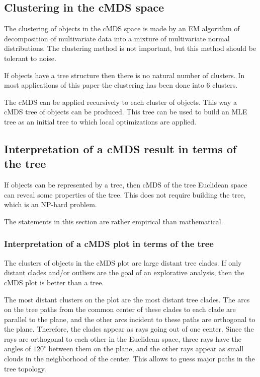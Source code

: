 \documentclass[10pt,a4paper]{article}
\begin{document}
\subsection {Clustering in the cMDS space}

The clustering of objects in the cMDS space is made by an EM algorithm of decomposition of multivariate data into a mixture of multivariate normal distributions. 
The clustering method is not important, but this method should be tolerant to noise. 

If objects have a tree structure then there is no natural number of clusters. 
In most applications of this paper the clustering has been done into 6 clusters. 

The cMDS can be applied recursively to each cluster of objects. 
This way a cMDS tree of objects can be produced. 
This tree can be used to build an MLE tree as an initial tree to which local optimizations are applied.


\subsection {Interpretation of a cMDS result in terms of the tree}

If objects can be represented by a tree, then cMDS of the tree Euclidean space can reveal some properties of the tree. 
This does not require building the tree, which is an NP-hard problem. 

The statements in this section are rather empirical than mathematical.


\subsubsection {Interpretation of a cMDS plot in terms of the tree}

The clusters of objects in the cMDS plot are large distant tree clades. 
If only distant clades and/or outliers are the goal of an explorative analysis, then the cMDS plot is better than a tree.

The most distant clusters on the plot are the most distant tree clades. 
The arcs on the tree paths from the common center of these clades to each clade are parallel to the plane, and the other arcs incident to these paths are orthogonal to the plane.
Therefore, the clades appear as rays going out of one center. 
Since the rays are orthogonal to each other in the Euclidean space, three rays have the angles of $120^\circ$ between them on the plane, and the other rays appear as small clouds in the neighborhood of the center. 
This allows to guess major paths in the tree topology.
\end{document}
